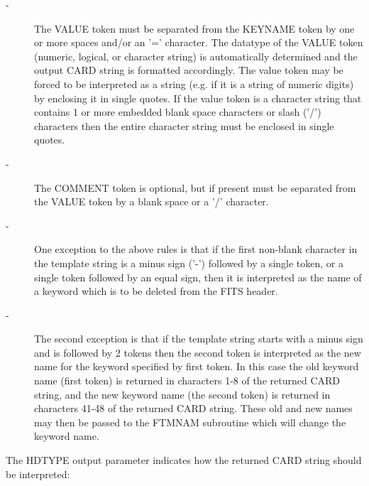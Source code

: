 \documentclass[11pt]{book}
\begin{document}
\begin{description}
\item[- ]     The VALUE token must be separated from the KEYNAME token by one or more
        spaces and/or an '=' character.  The datatype of the VALUE token
        (numeric, logical, or character string) is automatically determined
        and  the output CARD string is formatted accordingly.  The value
        token may be forced to be interpreted as a string (e.g. if it is a
        string of numeric digits) by enclosing it in single quotes.
        If the value token is a character string that contains 1 or more
        embedded blank space characters or slash ('/') characters then the
       entire character string must be enclosed in single quotes.
\end{description}


\begin{description}
\item[- ]     The COMMENT token is optional, but if present must be separated from
       the VALUE token by a blank space or a  '/' character.
\end{description}


\begin{description}
\item[- ]     One exception to the above rules is that if the first non-blank
        character in the template string is a minus sign ('-') followed
        by a single token, or a single token followed by an equal sign,
        then it is interpreted as the name of a keyword which is to be
       deleted from the FITS header.
\end{description}


\begin{description}
\item[- ]     The second exception is that if the template string starts with
        a minus sign and is followed by 2 tokens then the second token
        is interpreted as the new name for the keyword specified by
        first token.  In this case the old keyword name (first token)
        is returned in characters 1-8 of the returned CARD string, and
        the new keyword name (the second token) is returned in characters
        41-48 of the returned CARD string.  These old and new names
        may then be passed to the FTMNAM subroutine which will change
       the keyword name.
\end{description}

    The HDTYPE output parameter indicates how the returned CARD string
    should be interpreted:
\end{document}
